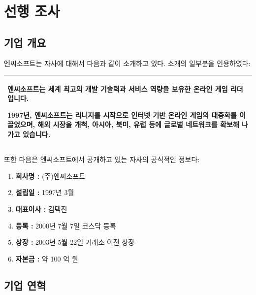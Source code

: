 \documentclass[11pt]{oblivoir}
\newenvironment{textbox}
	{
	\begin{center}
		\begin{tabular}{|p{0.95\textwidth}|}
			\hline
	}
	{
		\\ \hline
		\end{tabular}
		\end{center}
	}
\begin{document}
	\section{선행 조사}
		\subsection{기업 개요}
		\noindent 엔씨소프트는 자사에 대해서 다음과 같이 소개하고 있다. 소개의 일부분을 인용하였다:
		
		\begin{textbox}
			엔씨소프트는 세계 최고의 개발 기술력과 서비스 역량을 보유한 온라인 게임 리더입니다.
			
			1997년, 엔씨소프트는 리니지를 시작으로 인터넷 기반 온라인 게임의 대중화를 이끌었으며, 해외 시장을 개척, 아시아, 북미, 유럽 등에 글로벌 네트워크를 확보해 나가고 있습니다.
		\end{textbox} 
		\pagebreak
		
		\noindent 또한 다음은 엔씨소프트에서 공개하고 있는 자사의 공식적인 정보다:
		\begin{enumerate}
			\item \textbf{회사명 :} (주)엔씨소프트
			\item \textbf{설립일 :} 1997년 3월
  			\item \textbf{대표이사 :} 김택진
			\item \textbf{등록 :} 2000년 7월 7일 코스닥 등록 
			\item \textbf{상장 :} 2003년 5월 22일 거래소 이전 상장
			\item \textbf{자본금 :} 약 100 억 원
		\end{enumerate}
		
		\subsection{기업 연혁}
			\noindent
			
\end{document}
